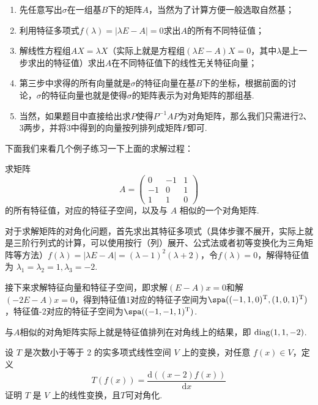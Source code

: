 \begin{enumerate}
    \item 先任意写出$\sigma$在一组基$B$下的矩阵$A$，当然为了计算方便一般选取自然基；

    \item 利用特征多项式$f(\lambda)=|\lambda E-A|=0$求出$A$的所有不同特征值；

    \item 解线性方程组$AX=\lambda X$（实际上就是方程组$(\lambda E-A)X=0$，其中$\lambda$是上一步求出的特征值）求出$A$在不同特征值下的线性无关特征向量；

    \item 第三步中求得的所有向量就是$\sigma$的特征向量在基$B$下的坐标，根据前面的讨论，$\sigma$的特征向量也就是使得$\sigma$的矩阵表示为对角矩阵的那组基.

    \item 当然，如果题目中直接给出求$P$使得$P^{-1}AP$为对角矩阵，那么我们只需进行2、3两步，并将3中得到的向量按列排列成矩阵$P$即可.
\end{enumerate}

下面我们来看几个例子练习一下上面的求解过程：
\begin{example}
    求矩阵
    \[A=\begin{pmatrix}
            0  & -1 & 1 \\
            -1 & 0  & 1 \\
            1  & 1  & 0
        \end{pmatrix}\]
    的所有特征值，对应的特征子空间，以及与 $A$ 相似的一个对角矩阵.
\end{example}

\begin{solution}
    对于求解矩阵的对角化问题，首先求出其特征多项式（具体步骤不展开，实际上就是三阶行列式的计算，可以使用按行（列）展开、公式法或者初等变换化为三角矩阵等方法）$f(\lambda)=|\lambda E-A|=(\lambda-1)^2(\lambda+2)$，令$f(\lambda)=0$，解得特征值为 $\lambda_1=\lambda_2=1,\lambda_3=-2$.

    接下来求解特征向量和特征子空间，即求解$(E-A)x=0$和解$(-2E-A)x=0$，得到特征值1对应的特征子空间为$\spa((-1,1,0)^{\mathrm{T}},(1,0,1)^{\mathrm{T}})$，特征值-2对应的特征子空间为$\spa((-1,-1,1)^{\mathrm{T}})$.

    与$A$相似的对角矩阵实际上就是特征值排列在对角线上的结果，即 $\operatorname{diag}(1,1,-2)$.
\end{solution}

\begin{example}
    设 $T$ 是次数小于等于 2 的实多项式线性空间 $V$ 上的变换，对任意 $f(x) \in V$，定义
    \[T(f(x))=\frac{\mathrm{d}((x-2)f(x))}{\mathrm{d}x}\]
    证明 $T$ 是 $V$ 上的线性变换，且$T$可对角化.
\end{example}


